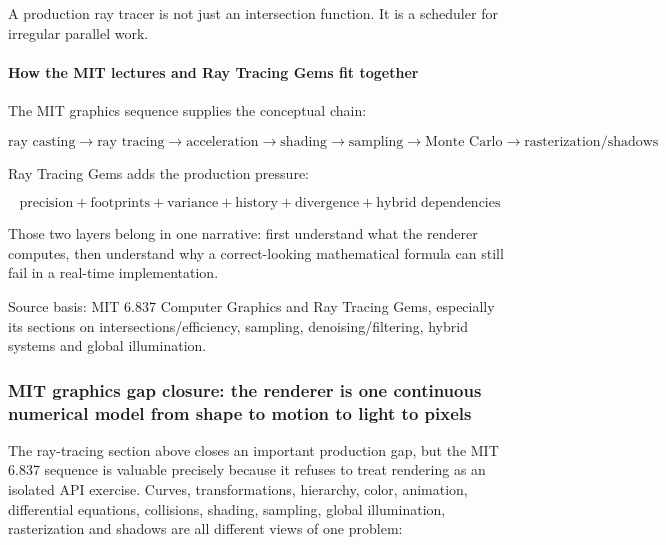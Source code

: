 A production ray tracer is not just an intersection function. It is a scheduler for irregular parallel work.

\paragraph{How the MIT lectures and Ray Tracing Gems fit together}\label{03-visual-computing-i-ch001-how-the-mit-lectures-and-ray-tracing-gems-fit-together}

\hypertarget{03-visual-computing-i-ch001-how-the-mit-lectures-and-ray-tracing-gems-fit-together}{}

The MIT graphics sequence supplies the conceptual chain:

\[
\text{ray casting}
\rightarrow
\text{ray tracing}
\rightarrow
\text{acceleration}
\rightarrow
\text{shading}
\rightarrow
\text{sampling}
\rightarrow
\text{Monte Carlo}
\rightarrow
\text{rasterization/shadows}
\]

Ray Tracing Gems adds the production pressure:

\[
\boxed{
\text{precision}
+
\text{footprints}
+
\text{variance}
+
\text{history}
+
\text{divergence}
+
\text{hybrid dependencies}
}
\]

Those two layers belong in one narrative: first understand what the renderer computes, then understand why a correct-looking mathematical formula can still fail in a real-time implementation.

Source basis: MIT 6.837 Computer Graphics and Ray Tracing Gems, especially its sections on intersections/efficiency, sampling, denoising/filtering, hybrid systems and global illumination.

\subsubsection{MIT graphics gap closure: the renderer is one continuous numerical model from shape to motion to light to pixels}\label{03-visual-computing-i-ch001-mit-graphics-gap-closure-the-renderer-is-one-continuous-numerical-model-from-shape-to-motion-to-light-to-pixels}

\hypertarget{03-visual-computing-i-ch001-mit-graphics-gap-closure-the-renderer-is-one-continuous-numerical-model-from-shape-to-motion-to-light-to-pixels}{}

The ray-tracing section above closes an important production gap, but the MIT 6.837 sequence is valuable precisely because it refuses to treat rendering as an isolated API exercise. Curves, transformations, hierarchy, color, animation, differential equations, collisions, shading, sampling, global illumination, rasterization and shadows are all different views of one problem:

